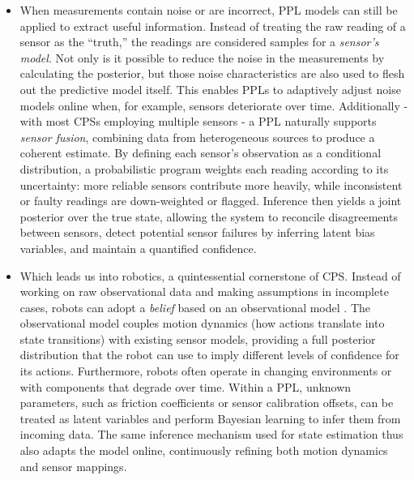 \begin{multicols}{2}
  \begin{itemize}
    \item When measurements contain noise or are incorrect, PPL models can still be applied to extract useful information. Instead of treating the raw reading of a sensor as the “truth,”
  the readings are considered samples for a \textit{sensor’s model}. Not only is it possible to reduce the noise in the measurements by calculating the posterior,
  but those noise characteristics are also used to flesh out the predictive model itself.
  This enables PPLs to adaptively adjust noise models online when, for example, sensors deteriorate over time.
  Additionally - with most CPSs employing multiple sensors - a PPL naturally supports \textit{sensor fusion}, \cite{cpsSensorFusion} combining data from heterogeneous sources
  to produce a coherent estimate. By defining each sensor's observation as a conditional distribution, a probabilistic program
  weights each reading according to its uncertainty: more reliable sensors contribute more heavily, while inconsistent or faulty readings are down-weighted or flagged.
  Inference then yields a joint posterior over the true state, allowing the system to reconcile disagreements between sensors, detect potential sensor failures by inferring
  latent bias variables, and maintain a quantified confidence.
  \item Which leads us into robotics, a quintessential cornerstone of CPS. Instead of working on raw observational data and making assumptions in incomplete cases, robots can adopt
  a \textit{belief} based on an observational model \cite{cpsProbabilisticRobotics}. The observational model couples motion dynamics (how actions translate into state
  transitions) with existing sensor models, providing a full posterior distribution that the robot can use to imply different levels of confidence for its actions.
  Furthermore, robots often operate in changing environments or with components that degrade over time. Within a PPL, unknown parameters, such as friction
  coefficients or sensor calibration offsets, can be treated as latent variables and perform Bayesian learning to infer them from incoming data. The same inference mechanism used for state
  estimation thus also adapts the model online, continuously refining both motion dynamics and sensor mappings.
  

\end{itemize}
\end{multicols}
